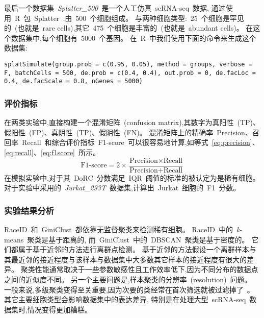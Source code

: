 最后一个数据集~\textit{Splatter\_500}~是一个人工仿真~scRNA-seq~数据,
通过使用~R~包~Splatter~\cite{zappia2017splatter},由~500~个细胞组成。
与两种细胞类型:~25~个细胞是罕见的~(也就是~rare cells),其它~475~个细胞是丰富的~(也就是~abundant cells)。
在这个数据集中,每个细胞有~5000~个基因。
在~R~中我们使用下面的命令来生成这个数据集:

\texttt{splatSimulate(group.prob = c(0.95, 0.05), method = groups, 
verbose = F, batchCells = 500, de.prob = c(0.4, 0.4), out.prob = 0, 
de.facLoc = 0.4, de.facScale = 0.8, nGenes = 5000)}

\subsubsection{评价指标}

在两类实验中,直接构建一个混淆矩阵~(confusion matrix),其数字为真阳性~(TP)、假阳性~(FP)、真阴性~(TP)、假阴性~(FN)。
混淆矩阵上的精确率~Precision、召回率~Recall~和综合评价指标~F1-score~可以很容易地计算,如等式~\ref{eq:precision}、\ref{eq:recall}、\ref{eq:f1score}~所示。
\begin{equation}
\label{eq:f1score}
\text{F1-score} = 2 \times \frac{\text{Precision} \times \text{Recall}}{ \text{Precision} + \text{Recall}}
\end{equation}
在模拟实验中,对于其~DoRC~分数满足~IQR~阈值的标准的被认定为是稀有细胞。
对于实验中采用的~\textit{Jurkat\_293T}~数据集,计算出~Jurkat~细胞的~F1~分数。

\subsubsection{实验结果分析}

\label{subsec:dorc}
RaceID~和~GiniClust~都依靠无监督聚类来检测稀有细胞。
RaceID~中的~\textit{k}-means~聚类是基于距离的,
而~GiniClust~中的~DBSCAN~聚类是基于密度的。
它们都属于基于近邻的方法进行离群点检测。
基于近邻的方法假设一个离群样本与其最近邻的接近程度与该样本与数据集中大多数其它样本的接近程度有很大的差异。
聚类性能通常取决于一些参数敏感性且工作效率低下,因为不同分布的数据点之间的近似度不同。
另一个主要问题是,样本聚类的分辨率~(resolution)~问题。
一般来说,多级聚类变得至关重要,因为次要的类经常在首次筛选就被过滤掉了~\cite{campbell2017molecular}。
其它主要细胞类型会影响数据集中的表达差异,
特别是在处理大型~scRNA-seq~数据集时,情况变得更加糟糕。

